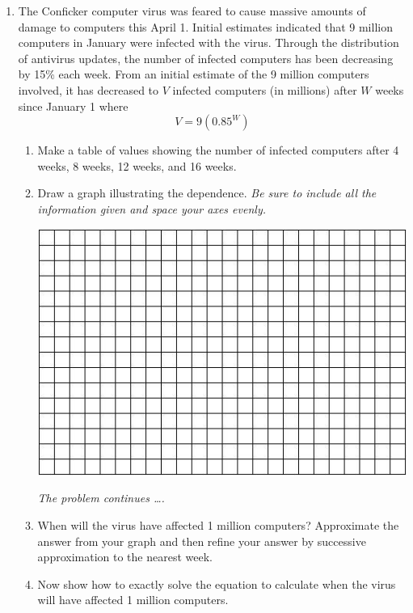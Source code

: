 \documentclass[12pt]{article}
\begin{document}
\newpage
\begin{enumerate}

\item The Conficker computer virus was feared to cause massive amounts of damage to computers this April 1.  Initial estimates indicated that 9 million computers in January were infected with the virus.  Through the distribution of antivirus updates, the number of infected computers has been decreasing by 15\% each week.  From an initial estimate of the 9 million computers involved, it has decreased to $V$ infected computers (in millions) after $W$ weeks since January 1 where $$V = 9(0.85^W)$$

\begin{enumerate}
\item Make a table of values showing the number of infected computers after 4 weeks, 8 weeks, 12 weeks, and 16 weeks.
\vfill
\item Draw a graph illustrating the dependence.  \emph{Be sure to include all the information given and space your axes evenly.}

\vspace{.1in}
\begin{center}
 {\includegraphics [width = 6in] {../GraphPaper}}
\end{center}
\vspace{.1in}

\newpage
\hspace{-.5 in}\emph{The problem continues \ldots.}

\item When will the virus have affected 1 million computers?  Approximate the answer from your graph and then refine your answer by successive approximation to the nearest week.
\vfill
\item Now show how to exactly solve the equation to calculate when the virus will have affected 1 million computers.
\vfill
\end{enumerate}





\end{enumerate}
\end{document}
